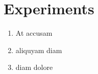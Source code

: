 \section{Experiments}
\label{sec:experiments}
\Blindtext
\begin{enumerate} \label{example:enumeration}
	\item At accusam
	\item aliquyam diam
	\item diam dolore
\end{enumerate}

\Blindtext
